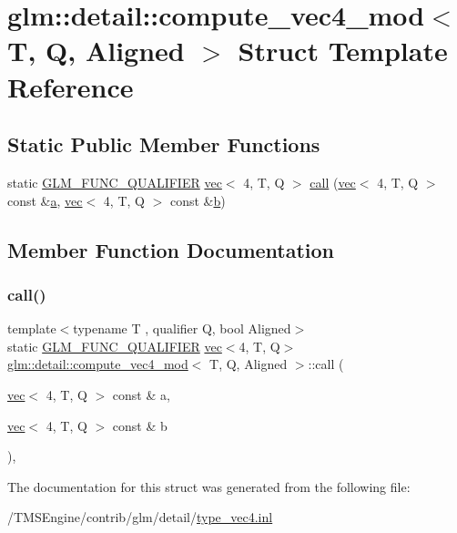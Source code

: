 \hypertarget{structglm_1_1detail_1_1compute__vec4__mod}{}\section{glm\+:\+:detail\+:\+:compute\+\_\+vec4\+\_\+mod$<$ T, Q, Aligned $>$ Struct Template Reference}
\label{structglm_1_1detail_1_1compute__vec4__mod}
\subsection*{Static Public Member Functions}
\begin{DoxyCompactItemize}
\item 
static \hyperlink{setup_8hpp_a33fdea6f91c5f834105f7415e2a64407}{G\+L\+M\+\_\+\+F\+U\+N\+C\+\_\+\+Q\+U\+A\+L\+I\+F\+I\+ER} \hyperlink{structglm_1_1vec}{vec}$<$ 4, T, Q $>$ \hyperlink{structglm_1_1detail_1_1compute__vec4__mod_a6076b5feebb458520ea9b393a8e822c1}{call} (\hyperlink{structglm_1_1vec}{vec}$<$ 4, T, Q $>$ const \&\hyperlink{_s_d_l__opengl__glext_8h_a3309789fc188587d666cda5ece79cf82}{a}, \hyperlink{structglm_1_1vec}{vec}$<$ 4, T, Q $>$ const \&\hyperlink{_s_d_l__opengl__glext_8h_a0f71581a41fd2264c8944126dabbd010}{b})
\end{DoxyCompactItemize}


\subsection{Member Function Documentation}
\mbox{\label{structglm_1_1detail_1_1compute__vec4__mod_a6076b5feebb458520ea9b393a8e822c1}} 
\subsubsection{\texorpdfstring{call()}{call()}}
{\footnotesize\ttfamily template$<$typename T , qualifier Q, bool Aligned$>$ \\
static \hyperlink{setup_8hpp_a33fdea6f91c5f834105f7415e2a64407}{G\+L\+M\+\_\+\+F\+U\+N\+C\+\_\+\+Q\+U\+A\+L\+I\+F\+I\+ER} \hyperlink{structglm_1_1vec}{vec}$<$4, T, Q$>$ \hyperlink{structglm_1_1detail_1_1compute__vec4__mod}{glm\+::detail\+::compute\+\_\+vec4\+\_\+mod}$<$ T, Q, Aligned $>$\+::call (\begin{DoxyParamCaption}\item[{\hyperlink{structglm_1_1vec}{vec}$<$ 4, T, Q $>$ const \&}]{a,  }\item[{\hyperlink{structglm_1_1vec}{vec}$<$ 4, T, Q $>$ const \&}]{b }\end{DoxyParamCaption})\hspace{0.3cm}{\ttfamily [inline]}, {\ttfamily [static]}}



The documentation for this struct was generated from the following file\+:\begin{DoxyCompactItemize}
\item 
/\+T\+M\+S\+Engine/contrib/glm/detail/\hyperlink{type__vec4_8inl}{type\+\_\+vec4.\+inl}\end{DoxyCompactItemize}
